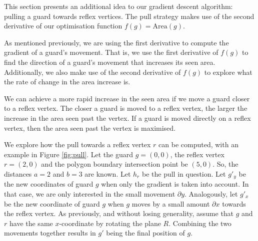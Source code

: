 This section presents an additional idea to our gradient descent algorithm: pulling a guard towards reflex vertices. The pull strategy makes use of the second derivative of our optimisation function $f(g) = \text{Area}(g)$.



As mentioned previously, we are using the first derivative to compute the gradient of a guard's movement. That is, we use the first derivative of $f(g)$ to find the direction of a guard's movement that increases its seen area. Additionally, we  also make use of the second derivative of $f(g)$ to explore what the rate of change in the area increase is. 

We can achieve a more rapid increase in the seen area if we move a guard closer to a reflex vertex. The closer a guard is moved to a reflex vertex, the larger the increase in the area seen past the vertex. If a guard is moved directly on a reflex vertex, then the area seen past the vertex is maximised. 



We explore how the pull towards a reflex vertex $r$ can be computed, with an example in Figure \ref{fig:pull}. Let the guard $g = (0, 0)$, the reflex vertex $r = (2, 0)$ and the polygon boundary intersection point be $(5, 0)$. So, the distances $a = 2$ and $b = 3$ are known. Let $h_r$ be the pull in question. Let $g'_y$ be the new coordinates of guard $g$ when only the gradient is taken into account. In that case, we are only interested in the small movement $\partial y$. Analogously, let $g'_x$ be the new coordinate of guard $g$ when $g$ moves by a small amount $\partial x$ towards the reflex vertex. As previously, and without losing generality, assume that $g$ and $r$ have the same $x$-coordinate by rotating the plane $R$. Combining the two movements together results in $g'$ being the final position of $g$.

